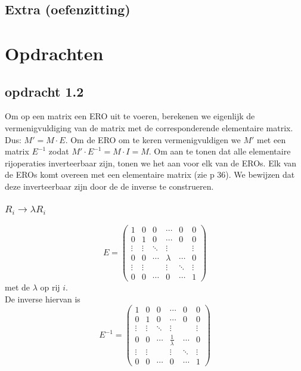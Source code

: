 \documentclass[10pt,a4paper]{article}
\begin{document}
\subsection*{Extra (oefenzitting)}


\section{Opdrachten}
\subsection*{opdracht 1.2}
Om op een matrix een ERO uit te voeren, berekenen we eigenlijk de vermenigvuldiging van de matrix met de corresponderende elementaire matrix. Dus: $M' = M \cdot E$. Om de ERO om te keren vermenigvuldigen we $M'$ met een matrix $E^{-1}$ zodat $M'\cdot E^{-1} = M \cdot I = M$.
Om aan te tonen dat alle elementaire rijoperaties inverteerbaar zijn, tonen we het aan voor elk van de EROs. Elk van de EROs komt overeen met een elementaire matrix (zie p 36). We bewijzen dat deze inverteerbaar zijn door de de inverse te construeren.
\subsubsection*{$R_i\rightarrow \lambda R_i$}
\[
E=
\begin{pmatrix}
1 & 0 & 0 & \cdots & 0 & 0\\
0 & 1 & 0 & \cdots & 0 & 0\\
\vdots & \vdots & \ddots & \vdots& & \vdots\\
0 & 0 & \cdots & \lambda & \cdots & 0\\
\vdots & \vdots & & \vdots& \ddots & \vdots\\
0 & 0 & \cdots & 0 & \cdots &1
\end{pmatrix}
\]
met de $\lambda$ op rij $i$.\\
De inverse hiervan is
\[
E^{-1}=
\begin{pmatrix}
1 & 0 & 0 & \cdots & 0 & 0\\
0 & 1 & 0 & \cdots & 0 & 0\\
\vdots & \vdots & \ddots & \vdots& & \vdots\\
0 & 0 & \cdots & \frac{1}{\lambda} & \cdots & 0\\
\vdots & \vdots & & \vdots& \ddots & \vdots\\
0 & 0 & \cdots & 0 & \cdots &1
\end{pmatrix}
\]
\end{document}
